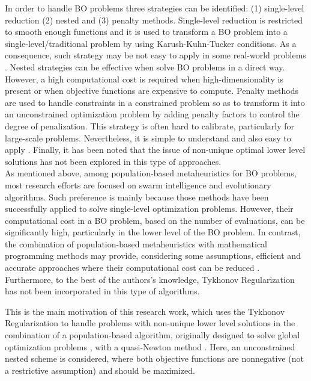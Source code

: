 \documentclass[conference]{IEEEtran}
\theoremstyle{definition}
\begin{document}
In order to handle BO problems three strategies can be identified: (1) single-level
reduction (2) nested and (3) penalty methods. Single-level reduction is restricted
to smooth enough functions and it is used to transform a BO problem into a single-level/traditional
problem by using Karush-Kuhn-Tucker conditions. As a consequence, such strategy
may be not easy to apply in some real-world problems  \cite{dempe2002foundations,colson2007overview}. %
Nested strategies can be effective when solve BO problems in a direct way. However, 
a high computational cost is required when high-dimensionality is present or when
objective functions are expensive to compute. Penalty methods are used to handle
constraints in a constrained problem so as to transform it into an unconstrained
optimization problem by adding penalty factors to control the degree of penalization.
This strategy is often hard to calibrate, particularly for large-scale problems.
Nevertheless, it is simple to understand and also easy to apply \cite{savard1994steepest,white1993penalty}.
Finally, it has been noted that the issue of non-unique optimal lower level
solutions has not been explored in this type of approaches.\\

As mentioned above, among population-based metaheuristics for BO problems, most
research efforts are focused on swarm intelligence and evolutionary algorithms.
Such preference is mainly because those methods have been successfully applied
to solve single-level optimization problems. However, their computational cost
in a BO problem, based on the number of evaluations, can be significantly high,
particularly in the lower level of the BO problem. In contrast, the combination
of population-based metaheuristics with mathematical programming methods may
provide, considering some assumptions, efficient and accurate approaches where
their computational cost can be reduced \cite{sinha2013efficient,wang2005evolutionary}.
Furthermore, to the best of the authors's knowledge, Tykhonov Regularization has
not been incorporated in this type of algorithms. 

This is the main motivation of this research work, which uses the Tykhonov
Regularization \cite{dempe2002foundations} to handle problems with non-unique
lower level solutions in the combination of a population-based algorithm, originally
designed to solve global optimization problems \cite{Mejia2018}, with a quasi-Newton
method \cite{fletcher2013practical}. Here, an unconstrained nested scheme is
considered, where both objective functions are nonnegative (not a restrictive
assumption) and should be maximized.
\end{document}
